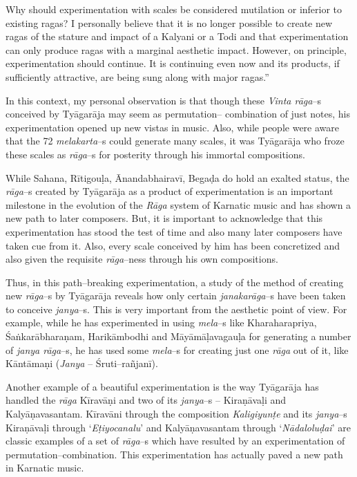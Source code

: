 \begin{myquote}
Why should experimentation with scales be considered mutilation or inferior to existing ragas? I personally believe that it is no longer possible to create new ragas of the stature and impact of a Kalyani or a Todi and that experimentation can only produce ragas with a marginal aesthetic impact. However, on principle, experimentation should continue. It is continuing even now and its products, if sufficiently attractive, are being sung along with major ragas.”
\end{myquote}

In this context, my personal observation is that though these \textit{Vinta rāga}–s conceived by Tyāgarāja may seem as permutation– combination of just notes, his experimentation opened up new vistas in music. Also, while people were aware that the 72 \textit{melakarta}–s could generate many scales, it was Tyāgarāja who froze these scales as \textit{rāga}–s for posterity through his immortal compositions.

While Sahana, Rītigouḷa, Ānandabhairavī, Begaḍa do hold an exalted status, the \textit{rāga}–s created by Tyāgarāja as a product of experimentation is an important milestone in the evolution of the \textit{Rāga} system of Karnatic music and has shown a new path to later composers. But, it is important to acknowledge that this experimentation has stood the test of time and also many later composers have taken cue from it. Also, every scale conceived by him has been concretized and also given the requisite \textit{rāga}–ness through his own compositions.

Thus, in this path–breaking experimentation, a study of the method of creating new \textit{rāga}–s by Tyāgarāja reveals how only certain \textit{janaka\break rāga}–s have been taken to conceive \textit{janya}–s. This is very important from the aesthetic point of view. For example, while he has experimented in using \textit{mela}–s like Kharaharapriya, Śaṅkarābharaṇam, Harikāmbodhi and Māyāmāḷavagauḷa for generating a number of \textit{janya rāga}–s, he has used some \textit{mela}–s for creating just one \textit{rāga} out of it, like Kāntāmaṇi (\textit{Janya} – Śruti–rañjanī).

Another example of a beautiful experimentation is the way Tyāgarāja has handled the \textit{rāga} Kīravāṇi and two of its \textit{janya}–s – Kiraṇāvaḷi and Kalyāṇavasantam. Kīravāni through the composition \textit{Kaligiyunṭe} and its \textit{janya}–s Kiraṇāvaḷi through ‘\textit{Eṭiyocanalu}’ and Kalyāṇavasantam through ‘\textit{Nādaloluḍai}’ are classic examples of a set of \textit{rāga}–s which have resulted by an experimentation of permutation–combination. This experimentation has actually paved a new path in Karnatic music.

